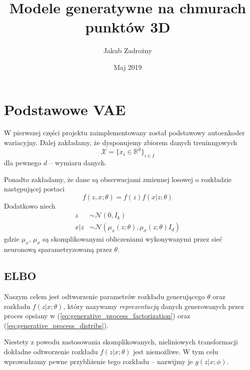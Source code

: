 \documentclass[12pt]{extarticle}
\title{Modele generatywne na chmurach punktów 3D}
\author{Jakub Zadrożny}
\date{Maj 2019}
\begin{document}
\maketitle

\section{Podstawowe VAE}
W pierwszej części projektu zaimplementowany został podstawowy
autoenkoder wariacyjny. Dalej zakładamy, że dysponujemy zbiorem
danych treninngowych
$$
\mathcal{X} = \{x_i \in \mathbb{R}^{d}\}_{i \in I}
$$
dla pewnego $d$ -- wymiaru danych.

Ponadto zakładamy, że dane są obserwacjami zmiennej losowej
o rozkładzie następującej postaci
\begin{equation}
f(z, x; \theta) = f(z)f(x|z; \theta)
\label{eq:generative_process_factorization}
\end{equation}
Dodatkowo niech
\begin{equation}
\begin{split}
z &\sim \mathcal{N}(0, I_k) \\
x|z &\sim \mathcal{N}(\mu_x(z; \theta), \mu_\sigma(z;\theta)I_d)
\end{split}
\label{eq:generative_process_distribs}
\end{equation}
gdzie $\mu_x,\,\mu_{\sigma}$ są skomplikowanymi obliczeniami
wykonywanymi przez sieć neuronową sparametryzowaną przez $\theta$.

\subsection{ELBO}
Naszym celem jest odtworzenie parametrów rozkładu generującego $\theta$
oraz rozkładu $f(z|x; \theta)$, który nazywamy \textit{reprezentacją} danych
generowanych przez proces opsiany w
(\ref{eq:generative_process_factorization}) oraz (\ref{eq:generative_process_distribs}).

Niestety z powodu zastosowania skomplikowanych, nieliniowych
transformacji dokładne odtworzenie rozkładu $f(z|x; \theta)$ jest niemożliwe.
W tym celu wprowadzamy pewne przybliżenie tego rozkładu -- nazwijmy je
$g(z|x; \phi)$.
\end{document}
